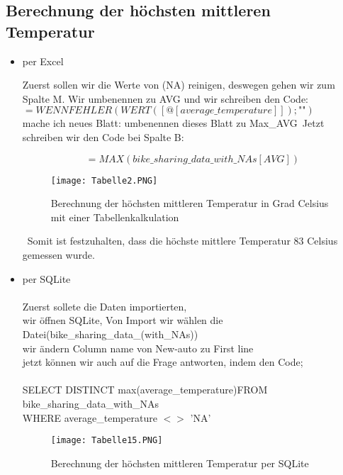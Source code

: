 \documentclass[1pt]{article}
\begin{document}
\subsection{Berechnung der höchsten mittleren Temperatur}
\begin{itemize}
\item per Excel

Zuerst sollen wir die Werte von (NA) reinigen, deswegen gehen wir zum Spalte M. Wir umbenennen zu AVG und wir schreiben den Code: 
$=WENNFEHLER(WERT([@[average\_temperature]]);\text{""})$\\
mache ich  neues Blatt: umbenennen dieses Blatt zu Max\_AVG\
Jetzt schreiben wir den Code bei Spalte B:

$$ =MAX(bike\_sharing\_data\_with\_NAs[AVG]) $$

\begin{figure}[h] %
    \centering %
    \texttt{[image: Tabelle2.PNG]} %
\caption{{\tiny Berechnung der höchsten mittleren Temperatur in Grad Celsius mit einer Tabellenkalkulation}}
   
    \label{fig:meinBild} %
\end{figure}
\vspace{1cm}\
Somit ist festzuhalten, dass die höchste mittlere Temperatur 83 Celsius gemessen wurde. 

\newpage
\item per SQLite \\
\\Zuerst sollete die Daten importierten,\\
wir öffnen SQLite, Von Import wir wählen die Datei(bike\_sharing\_data\_(with\_NAs))\\
wir ändern  Column name von New-auto zu First line\\

jetzt können wir auch auf die Frage antworten, indem den Code;\\
\\SELECT DISTINCT max(average\_temperature)FROM bike\_sharing\_data\_with\_NAs
\\WHERE average\_temperature $<>$ 'NA'


\begin{figure}[h] %
    \centering %
    \texttt{[image: Tabelle15.PNG]} %
    \caption{Berechnung der höchsten mittleren Temperatur per SQLite}
   
    \label{fig:meinBild} %
\end{figure}\\

\end{itemize}
\end{document}
